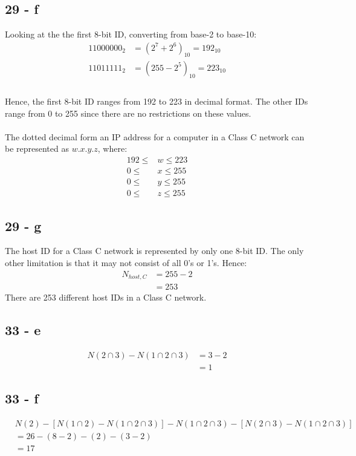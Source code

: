 \documentclass[12pt]{article}
\begin{document}
\subsection*{29 - f}
Looking at the the first 8-bit ID, converting from base-2 to base-10:
\begin{align*}
  11000000_2 &= (2^7+ 2^6)_{10} = 192_{10} \\
  11011111_2 &= (255 - 2^5)_{10} = 223_{10} \\
\end{align*}
\\ 
Hence, the first 8-bit ID ranges from 192 to 223 in decimal format. The other IDs range from 0 to 255 since there are no restrictions on these values.
\\ \\
The dotted decimal form an IP address for a computer in a Class C network can be represented as $w.x.y.z$, where:
\begin{align*}
  192 \leq &w \leq 223 \\
  0 \leq &x \leq 255 \\
  0 \leq &y \leq 255 \\
  0 \leq &z \leq 255
\end{align*}

\subsection*{29 - g}
The host ID for a Class C network is represented by only one 8-bit ID. The only other limitation is that it may not consist of all 0's or 1's. Hence:
\begin{align*}
  N_{host, C} &= 255 - 2 \\
  &= 253
\end{align*}
There are 253 different host IDs in a Class C network.
\subsection*{33 - e}
\begin{align*}
  N(2\cap3) - N(1 \cap 2 \cap 3) &= 3 - 2 \\
  &= 1
\end{align*}

\subsection*{33 - f}
\begin{align*}
  &N(2) - [N(1\cap2) - N(1\cap2\cap3)] - N(1\cap2\cap3) -[N(2\cap3) - N(1\cap2\cap3)] \\
  &= 26 - (8-2) - (2) - (3-2) \\
  &= 17
\end{align*}
\end{document}
